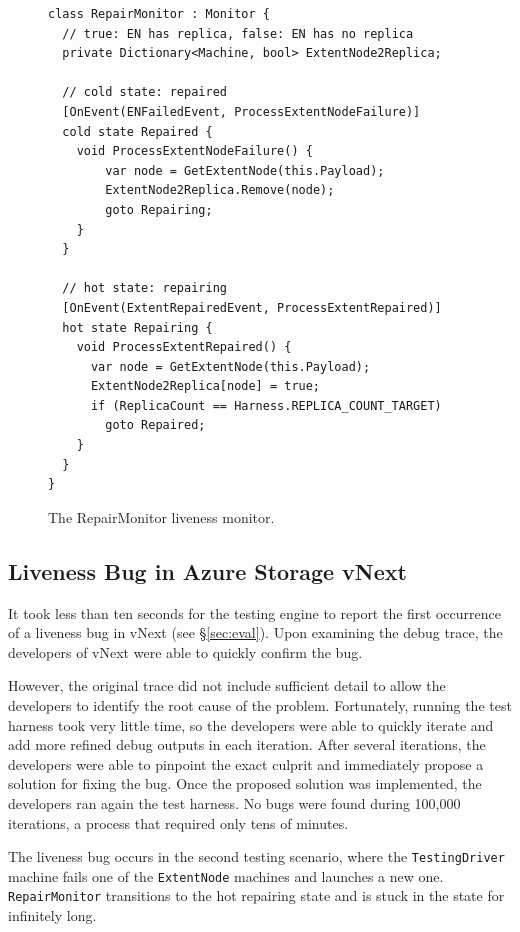\begin{figure}[t]
\begin{lstlisting}
class RepairMonitor : Monitor {
  // true: EN has replica, false: EN has no replica
  private Dictionary<Machine, bool> ExtentNode2Replica;

  // cold state: repaired
  [OnEvent(ENFailedEvent, ProcessExtentNodeFailure)]
  cold state Repaired {
    void ProcessExtentNodeFailure() {
        var node = GetExtentNode(this.Payload);
        ExtentNode2Replica.Remove(node);
        goto Repairing;
    }
  }

  // hot state: repairing
  [OnEvent(ExtentRepairedEvent, ProcessExtentRepaired)]
  hot state Repairing {
    void ProcessExtentRepaired() {
      var node = GetExtentNode(this.Payload);
      ExtentNode2Replica[node] = true;
      if (ReplicaCount == Harness.REPLICA_COUNT_TARGET)
        goto Repaired;
    }
  }
}
\end{lstlisting}
\vspace{-4mm}
\caption{The RepairMonitor liveness monitor.}
\label{fig:monitor}
\vspace{-2mm}
\end{figure}

\subsection{Liveness Bug in Azure Storage vNext}
\label{sec:method:azurestore}

It took less than ten seconds for the \psharp testing engine to report the first occurrence of a liveness bug in vNext (see \S\ref{sec:eval}). Upon examining the debug trace, the developers of vNext were able to quickly confirm the bug.

However, the original \psharp trace did not include sufficient detail to allow the developers to identify the root cause of the problem. Fortunately, running the test harness took very little time, so the developers were able to quickly iterate and add more refined debug outputs in each iteration. After several iterations, the developers were able to pinpoint the exact culprit and immediately propose a solution for fixing the bug. Once the proposed solution was implemented, the developers ran again the test harness. No bugs were found during 100,000 iterations, a process that required only tens of minutes.

The liveness bug occurs in the second testing scenario, where the \texttt{TestingDriver} machine fails one of the \texttt{ExtentNode} machines and launches a new one. \texttt{RepairMonitor} transitions to the hot repairing state and is stuck in the state for infinitely long.

